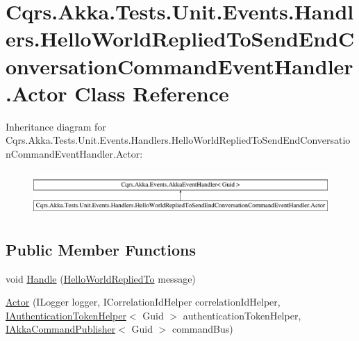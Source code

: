 \hypertarget{classCqrs_1_1Akka_1_1Tests_1_1Unit_1_1Events_1_1Handlers_1_1HelloWorldRepliedToSendEndConversationCommandEventHandler_1_1Actor}{}\section{Cqrs.\+Akka.\+Tests.\+Unit.\+Events.\+Handlers.\+Hello\+World\+Replied\+To\+Send\+End\+Conversation\+Command\+Event\+Handler.\+Actor Class Reference}
\label{classCqrs_1_1Akka_1_1Tests_1_1Unit_1_1Events_1_1Handlers_1_1HelloWorldRepliedToSendEndConversationCommandEventHandler_1_1Actor}
Inheritance diagram for Cqrs.\+Akka.\+Tests.\+Unit.\+Events.\+Handlers.\+Hello\+World\+Replied\+To\+Send\+End\+Conversation\+Command\+Event\+Handler.\+Actor\+:\begin{figure}[H]
\begin{center}
\leavevmode
\includegraphics[height=1.728395cm]{classCqrs_1_1Akka_1_1Tests_1_1Unit_1_1Events_1_1Handlers_1_1HelloWorldRepliedToSendEndConversationCommandEventHandler_1_1Actor}
\end{center}
\end{figure}
\subsection*{Public Member Functions}
\begin{DoxyCompactItemize}
\item 
void \hyperlink{classCqrs_1_1Akka_1_1Tests_1_1Unit_1_1Events_1_1Handlers_1_1HelloWorldRepliedToSendEndConversationCommandEventHandler_1_1Actor_a76a10208a1b9e3f81a36c48bc6b751eb_a76a10208a1b9e3f81a36c48bc6b751eb}{Handle} (\hyperlink{classCqrs_1_1Akka_1_1Tests_1_1Unit_1_1Events_1_1HelloWorldRepliedTo}{Hello\+World\+Replied\+To} message)
\item 
\hyperlink{classCqrs_1_1Akka_1_1Tests_1_1Unit_1_1Events_1_1Handlers_1_1HelloWorldRepliedToSendEndConversationCommandEventHandler_1_1Actor_a10cd8c5ff7e2ee041ab26aad766b0857_a10cd8c5ff7e2ee041ab26aad766b0857}{Actor} (I\+Logger logger, I\+Correlation\+Id\+Helper correlation\+Id\+Helper, \hyperlink{interfaceCqrs_1_1Authentication_1_1IAuthenticationTokenHelper}{I\+Authentication\+Token\+Helper}$<$ Guid $>$ authentication\+Token\+Helper, \hyperlink{interfaceCqrs_1_1Akka_1_1Commands_1_1IAkkaCommandPublisher}{I\+Akka\+Command\+Publisher}$<$ Guid $>$ command\+Bus)
\end{DoxyCompactItemize}
